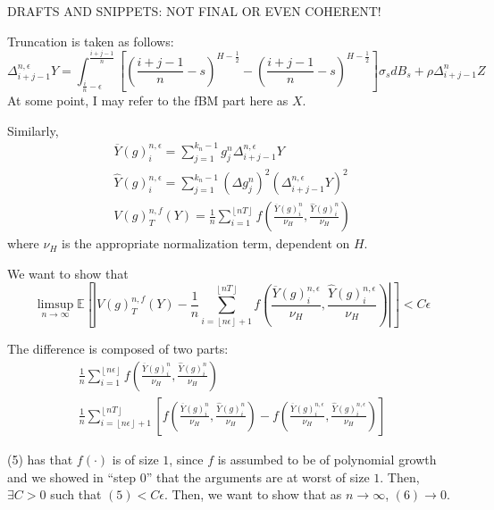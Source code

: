 \documentclass[12pt,letterpaper]{article}
\theoremstyle{lemma}
\theoremstyle{definition}
\newcommand{\E}{\mathbb{E}}
\begin{document}
\pagebreak
DRAFTS AND SNIPPETS: NOT FINAL OR EVEN COHERENT!

Truncation is taken as follows:
\begin{equation}
  \Delta_{i+j-1}^{n,\epsilon} Y =  \int_{\frac{i}{n}-\epsilon}^{\frac{i+j-1}{n}} \left[ \left( \frac{i+j-1}{n} -s \right)^{H - \frac{1}{2}} - \left( \frac{i+j-1}{n} -s \right)^{H - \frac{1}{2}} \right]\sigma_s dB_s + \rho\Delta_{i+j-1}^n Z
\end{equation}
At some point, I may refer to the fBM part here as \(X\).

Similarly,
\begin{gather}
  \overline{Y}(g)^{n,\epsilon}_i = \sum_{j=1}^{k_n-1} g^n_j \Delta_{i+j-1}^{n,\epsilon} Y \\
  \widehat{Y}(g)^{n,\epsilon}_i = \sum_{j=1}^{k_n-1} (\Delta g^n_j)^2 (\Delta_{i+j-1}^{n,\epsilon} Y)^2 \\
  V(g)^{n,f}_T(Y) = \frac{1}{n}\sum_{i=1}^{\left\lfloor nT \right\rfloor} f\left( \frac{\overline{Y}(g)^n_i}{\nu_H}, \frac{\widehat{Y}(g)^n_i}{\nu_H} \right)
\end{gather}
where \(\nu_H\) is the appropriate normalization term, dependent on \(H\).

We want to show that
\[
  \limsup_{n \rightarrow \infty} \E \left[ \left| V(g)^{n,f}_T(Y) - \frac{1}{n}\sum_{i=\left\lfloor n\epsilon \right\rfloor + 1}^{\left\lfloor nT \right\rfloor} f\left( \frac{\overline{Y}(g)^{n,\epsilon}_i}{\nu_H}, \frac{\widehat{Y}(g)^{n,\epsilon}_i}{\nu_H} \right) \right| \right] < C\epsilon
\]

The difference is composed of two parts:
\begin{gather}
  \frac{1}{n}\sum_{i=1}^{\left\lfloor n\epsilon \right\rfloor} f\left( \frac{\overline{Y}(g)^n_i}{\nu_H}, \frac{\widehat{Y}(g)^n_i}{\nu_H} \right) \\
  \frac{1}{n}\sum_{i=\left\lfloor n\epsilon \right\rfloor + 1}^{\left\lfloor nT \right\rfloor}\left[ f\left( \frac{\overline{Y}(g)^{n}_i}{\nu_H}, \frac{\widehat{Y}(g)^{n}_i}{\nu_H} \right) -  f\left( \frac{\overline{Y}(g)^{n,\epsilon}_i}{\nu_H}, \frac{\widehat{Y}(g)^{n,\epsilon}_i}{\nu_H} \right) \right]
\end{gather}

(5) has that \(f(\cdot)\) is of size \(1\), since \(f\) is assumbed to be of polynomial growth and we showed in ``step 0'' that the arguments are at worst of size \(1\). Then, \(\exists C > 0\) such that \((5) < C\epsilon\). Then, we want to show that as \(n \rightarrow \infty\), \((6) \rightarrow 0\).
\end{document}
